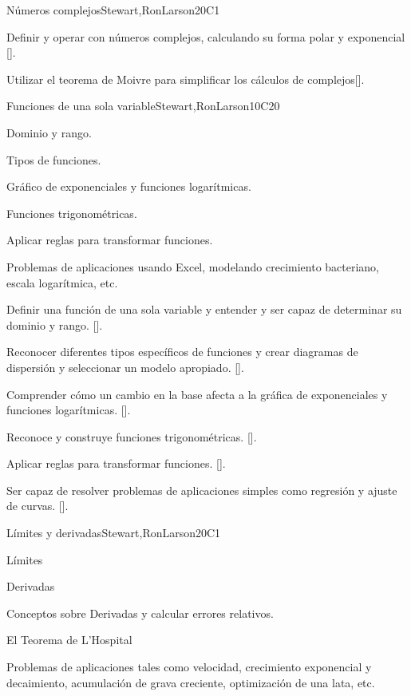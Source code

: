 \begin{syllabus}
\begin{unit}{Números complejos}{}{Stewart,RonLarson}{20}{C1}
   \begin{learningoutcomes}
      \item  Definir y operar con números complejos, calculando su forma polar y exponencial [\Assessment].
      \item  Utilizar el teorema de Moivre para simplificar los cálculos de complejos[\Assessment].
      \end{learningoutcomes}
\end{unit}

\begin{unit}{Funciones de una sola variable}{}{Stewart,RonLarson}{10}{C20}

  
  \begin{topics}
    \item Dominio y rango.
    \item Tipos de funciones.
    \item Gráfico de exponenciales y funciones logarítmicas.
    \item Funciones trigonométricas.
    \item Aplicar reglas para transformar funciones.
    \item  Problemas de aplicaciones usando Excel, modelando crecimiento bacteriano, escala logarítmica, etc.
   \end{topics}

   \begin{learningoutcomes}
      \item Definir una función de una sola variable y entender y ser capaz de determinar su dominio y rango. [\Assessment].
      \item Reconocer diferentes tipos específicos de funciones y crear diagramas de dispersión y seleccionar un modelo apropiado. [\Assessment].
      \item Comprender cómo un cambio en la base afecta a la gráfica de exponenciales y funciones logarítmicas. [\Assessment].
      \item Reconoce y construye funciones trigonométricas. [\Assessment].
      \item Aplicar reglas para transformar funciones. [\Assessment].
      \item Ser capaz de resolver problemas de aplicaciones simples como regresión y ajuste de curvas. [\Assessment].
    \end{learningoutcomes}
\end{unit}

\begin{unit}{Límites y derivadas}{}{Stewart,RonLarson}{20}{C1}
   \begin{topics}
      \item Límites
      \item Derivadas
      \item Conceptos sobre Derivadas y calcular errores relativos.
      \item El Teorema de L'Hospital
      \item Problemas de aplicaciones tales como velocidad, crecimiento exponencial y decaimiento, acumulación de grava creciente, optimización de una lata, etc.
   \end{topics}


\end{unit}
\end{syllabus}
